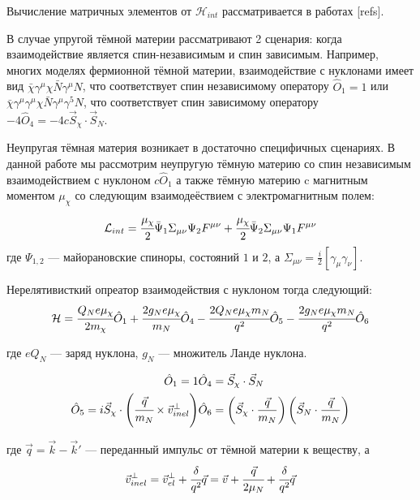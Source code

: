 \documentclass[a4paper, 14pt]{article}
\begin{document}
Вычисление матричных элементов от $\mathcal{H}_{int}$ рассматривается в работах [refs]. 

В случае упругой тёмной материи рассматривают 2 сценария: когда взаимодействие является спин-независимым и спин зависимым. 
Например, многих моделях фермионной тёмной материи, взаимодействие с нуклонами имеет вид $\bar{\chi}\gamma^{\mu}\chi \bar{N}\gamma^{\mu}N$, что соответствует спин независимому оператору $\hat{O}_1 = 1$ или $\bar{\chi}\gamma^{\mu}\gamma^{\mu}\chi \bar{N}\gamma^{\mu}\gamma^{5}N$, что соответствует спин зависимому оператору $-4\hat{O}_4 = -4c \vec{S}_{\chi}\cdot\vec{S}_{N}$.

Неупругая тёмная материя возникает в достаточно специфичных сценариях. В данной работе мы рассмотрим неупругую тёмную материю со спин независимым взаимодействием с нуклоном $c \hat{O}_1$ а также тёмную материю c магнитным моментом $\mu_{\chi}$ со следующим взаимодеёствием с электромагнитным полем:
	\begin{equation*}
	\mathcal{L}_{int} = \cfrac{\mu_{\chi}}{2} \bar{\Psi}_1 \Sigma_{\mu\nu} \Psi_2 F^{\mu\nu} + \cfrac{\mu_{\chi}}{2} \bar{\Psi}_2 \Sigma_{\mu\nu} \Psi_1 F^{\mu\nu} 
\end{equation*}
где ${\Psi}_{1,2}$ --- майорановские спиноры, состояний $1$ и $2$, а $\Sigma_{\mu\nu} = \frac{i}{2}[\gamma_{\mu}\gamma_{\nu}]$.

Нерелятивисткий опреатор взаимодействия с нуклоном тогда следующий:
\begin{equation}
	\mathcal{H} = 
	\cfrac{Q_N e\mu_{\chi}}{2m_{\chi}} \hat{O}_1 + 
	\cfrac{2g_N e\mu_{\chi}}{m_{N}} \hat{O}_4-
	\cfrac{2Q_N e\mu_{\chi} m_{N} }{q^2} \hat{O}_5 -
	\cfrac{2g_N e\mu_{\chi} m_{N}}{q^2} \hat{O}_6
\end{equation}

где $e Q_N$ --- заряд нуклона,  $g_N$ --- множитель Ланде нуклона.


\begin{eqnarray}
	\hat{O}_1 = 1 & 
	\hat{O}_4 = \vec{S}_{\chi}\cdot\vec{S}_{N} \\
	\hat{O}_5 = i\vec{S}_{\chi}\cdot \left(\cfrac{\vec{q}}{m_N} \times \vec{v}^{\perp}_{inel} \right) & 
	\hat{O}_6 = \left(\vec{S}_{\chi} \cdot \frac{\vec{q}}{m_N}\right)\left(\vec{S}_N \cdot \frac{\vec{q}}{m_N}\right)
\end{eqnarray}

где $\vec{q} = \vec{k} - \vec{k}'$ --- переданный импульс от тёмной материи к веществу, а 
\begin{equation}
	\vec{v}^{\perp}_{inel} = \vec{v}^{\perp}_{el} + \cfrac{\delta}{q^2} \vec{q} = \vec{v}+\cfrac{\vec{q}}{2\mu_{N}} + \cfrac{\delta}{q^2} \vec{q}
\end{equation}
\end{document}
